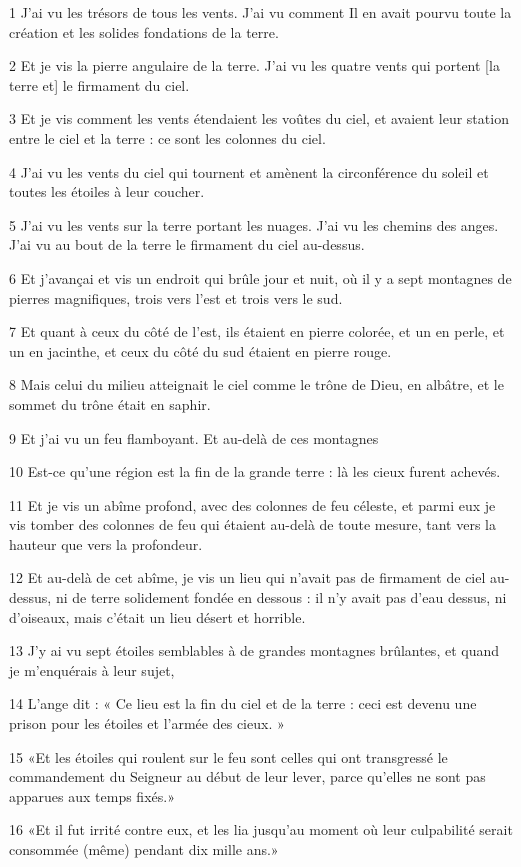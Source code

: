 
\par 1 J'ai vu les trésors de tous les vents. J'ai vu comment Il en avait pourvu toute la création et les solides fondations de la terre.
\par 2 Et je vis la pierre angulaire de la terre. J'ai vu les quatre vents qui portent [la terre et] le firmament du ciel.
\par 3 Et je vis comment les vents étendaient les voûtes du ciel, et avaient leur station entre le ciel et la terre : ce sont les colonnes du ciel.
\par 4 J'ai vu les vents du ciel qui tournent et amènent la circonférence du soleil et toutes les étoiles à leur coucher.
\par 5 J'ai vu les vents sur la terre portant les nuages. J'ai vu les chemins des anges. J'ai vu au bout de la terre le firmament du ciel au-dessus.
\par 6 Et j'avançai et vis un endroit qui brûle jour et nuit, où il y a sept montagnes de pierres magnifiques, trois vers l'est et trois vers le sud.
\par 7 Et quant à ceux du côté de l'est, ils étaient en pierre colorée, et un en perle, et un en jacinthe, et ceux du côté du sud étaient en pierre rouge.
\par 8 Mais celui du milieu atteignait le ciel comme le trône de Dieu, en albâtre, et le sommet du trône était en saphir.
\par 9 Et j'ai vu un feu flamboyant. Et au-delà de ces montagnes
\par 10 Est-ce qu'une région est la fin de la grande terre : là les cieux furent achevés.
\par 11 Et je vis un abîme profond, avec des colonnes de feu céleste, et parmi eux je vis tomber des colonnes de feu qui étaient au-delà de toute mesure, tant vers la hauteur que vers la profondeur.
\par 12 Et au-delà de cet abîme, je vis un lieu qui n'avait pas de firmament de ciel au-dessus, ni de terre solidement fondée en dessous : il n'y avait pas d'eau dessus, ni d'oiseaux, mais c'était un lieu désert et horrible.
\par 13 J'y ai vu sept étoiles semblables à de grandes montagnes brûlantes, et quand je m'enquérais à leur sujet,
\par 14 L'ange dit : « Ce lieu est la fin du ciel et de la terre : ceci est devenu une prison pour les étoiles et l'armée des cieux. »
\par 15 «Et les étoiles qui roulent sur le feu sont celles qui ont transgressé le commandement du Seigneur au début de leur lever, parce qu'elles ne sont pas apparues aux temps fixés.»
\par 16 «Et il fut irrité contre eux, et les lia jusqu'au moment où leur culpabilité serait consommée (même) pendant dix mille ans.»

